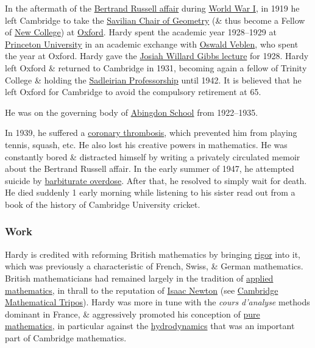\documentclass{article}
\begin{document}
In the aftermath of the \href{https://en.wikipedia.org/wiki/Bertrand_Russell#First_World_War}{Bertrand Russell affair} during \href{https://en.wikipedia.org/wiki/World_War_I}{World War I}, in 1919 he left Cambridge to take the \href{https://en.wikipedia.org/wiki/Savilian_Chair_of_Geometry}{Savilian Chair of Geometry} (\& thus become a Fellow of \href{https://en.wikipedia.org/wiki/New_College,_Oxford}{New College}) at \href{https://en.wikipedia.org/wiki/Oxford_University}{Oxford}. {\sc Hardy} spent the academic year 1928--1929 at \href{https://en.wikipedia.org/wiki/Princeton_University}{Princeton University} in an academic exchange with \href{https://en.wikipedia.org/wiki/Oswald_Veblen}{Oswald Veblen}, who spent the year at Oxford. {\sc Hardy} gave the \href{https://en.wikipedia.org/wiki/Josiah_Willard_Gibbs_Lectureship}{Josiah Willard Gibbs lecture} for 1928. {\sc Hardy} left Oxford \& returned to Cambridge in 1931, becoming again a fellow of Trinity College \& holding the \href{https://en.wikipedia.org/wiki/Sadleirian_Professor_of_Pure_Mathematics}{Sadleirian Professorship} until 1942. It is believed that he left Oxford for Cambridge to avoid the compulsory retirement at 65.

He was on the governing body of \href{https://en.wikipedia.org/wiki/Abingdon_School}{Abingdon School} from 1922--1935.

In 1939, he suffered a \href{https://en.wikipedia.org/wiki/Coronary_thrombosis}{coronary thrombosis}, which prevented him from playing tennis, squash, etc. He also lost his creative powers in mathematics. He was constantly bored \& distracted himself by writing a privately circulated memoir about the {\sc Bertrand Russell} affair. In the early summer of 1947, he attempted suicide by \href{https://en.wikipedia.org/wiki/Barbiturate_overdose}{barbiturate overdose}. After that, he resolved to simply wait for death. He died suddenly 1 early morning while listening to his sister read out from a book of the history of Cambridge University cricket.

\subsubsection{Work}
{\sc Hardy} is credited with reforming British mathematics by bringing \href{https://en.wikipedia.org/wiki/Rigour#Mathematical_rigour}{rigor} into it, which was previously a characteristic of French, Swiss, \& German mathematics. British mathematicians had remained largely in the tradition of \href{https://en.wikipedia.org/wiki/Applied_mathematics}{applied mathematics}, in thrall to the reputation of \href{https://en.wikipedia.org/wiki/Isaac_Newton}{\sc Isaac Newton} (see \href{https://en.wikipedia.org/wiki/Cambridge_Mathematical_Tripos}{Cambridge Mathematical Tripos}). {\sc Hardy} was more in tune with the {\it cours d'analyse} methods dominant in France, \& aggressively promoted his conception of \href{https://en.wikipedia.org/wiki/Pure_mathematics}{pure mathematics}, in particular against the \href{https://en.wikipedia.org/wiki/Hydrodynamics}{hydrodynamics} that was an important part of Cambridge mathematics.
\end{document}
